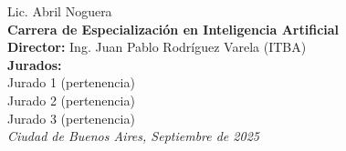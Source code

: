 \begin{titlepage}
\begin{flushright}
        {\fontsize{20pt}{25pt}\selectfont
        Lic. Abril Noguera} \\[1cm]

        {\fontsize{15pt}{20pt}\selectfont
        \textbf{Carrera de Especialización en Inteligencia Artificial}
        } \\[2cm]

        {\fontsize{11pt}{15pt}\selectfont
        \textbf{Director:} Ing. Juan Pablo Rodríguez Varela (ITBA)} \\[1cm]

        {\fontsize{11pt}{15pt}\selectfont
        \textbf{Jurados:}} \\[0.5cm]
        {\fontsize{11pt}{15pt}\selectfont
        Jurado 1 (pertenencia)} \\ 
        {\fontsize{11pt}{15pt}\selectfont
        Jurado 2 (pertenencia)} \\ 
        {\fontsize{11pt}{15pt}\selectfont
        Jurado 3 (pertenencia)} \\[2cm]

        {\itshape\fontsize{10pt}{12pt}\selectfont
        Ciudad de Buenos Aires, Septiembre de 2025} %
    \end{flushright}
\end{titlepage}
